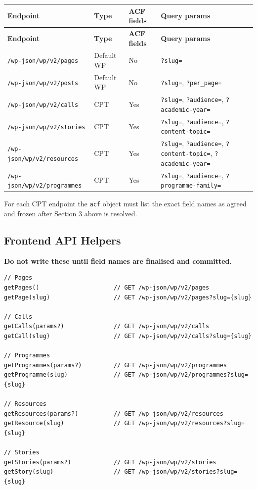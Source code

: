 \documentclass[12pt,a4paper]{article}
\begin{document}
\vspace{0.4em}
\begin{longtable}{@{}p{4.5cm}p{2cm}p{2.5cm}p{3.3cm}@{}}
\toprule
\rowcolor{uvtLightBlue}
\textbf{Endpoint} & \textbf{Type} & \textbf{ACF fields} & \textbf{Query params} \\
\midrule
\endfirsthead
\toprule
\rowcolor{uvtLightBlue}
\textbf{Endpoint} & \textbf{Type} & \textbf{ACF fields} & \textbf{Query params} \\
\midrule
\endhead
\bottomrule
\endfoot
\texttt{/wp-json/wp/v2/pages} & Default WP & No & \texttt{?slug=} \\
\texttt{/wp-json/wp/v2/posts} & Default WP & No & \texttt{?slug=}, \texttt{?per\_page=} \\
\texttt{/wp-json/wp/v2/calls} & CPT & Yes & \texttt{?slug=}, \texttt{?audience=}, \texttt{?academic-year=} \\
\texttt{/wp-json/wp/v2/stories} & CPT & Yes & \texttt{?slug=}, \texttt{?audience=}, \texttt{?content-topic=} \\
\texttt{/wp-json/wp/v2/resources} & CPT & Yes & \texttt{?slug=}, \texttt{?audience=}, \texttt{?content-topic=}, \texttt{?academic-year=} \\
\texttt{/wp-json/wp/v2/programmes} & CPT & Yes & \texttt{?slug=}, \texttt{?audience=}, \texttt{?programme-family=} \\
\end{longtable}

For each CPT endpoint the \texttt{acf} object must list the exact field names as agreed
and frozen after Section 3 above is resolved.

\subsection{Frontend API Helpers}

\begin{redbox}
\textbf{Do not write these until field names are finalised and committed.}
\end{redbox}

\begin{lstlisting}
// Pages
getPages()                     // GET /wp-json/wp/v2/pages
getPage(slug)                  // GET /wp-json/wp/v2/pages?slug={slug}

// Calls
getCalls(params?)              // GET /wp-json/wp/v2/calls
getCall(slug)                  // GET /wp-json/wp/v2/calls?slug={slug}

// Programmes
getProgrammes(params?)         // GET /wp-json/wp/v2/programmes
getProgramme(slug)             // GET /wp-json/wp/v2/programmes?slug={slug}

// Resources
getResources(params?)          // GET /wp-json/wp/v2/resources
getResource(slug)              // GET /wp-json/wp/v2/resources?slug={slug}

// Stories
getStories(params?)            // GET /wp-json/wp/v2/stories
getStory(slug)                 // GET /wp-json/wp/v2/stories?slug={slug}
\end{lstlisting}
\end{document}
